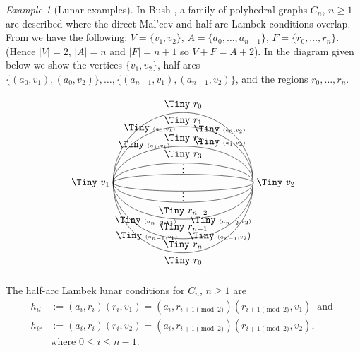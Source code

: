 \documentclass[12pt]{amsart}
\theoremstyle{definition}
\theoremstyle{remark}
\newtheorem{example}[thm]{Example}
\numberwithin{equation}{section}
\begin{document}
\begin{example}[Lunar examples] \label{ex:bush}
In Bush \cite{B}, a family of polyhedral graphs $C_n$, $n \ge 1$ are described  where the direct Ma{l}'cev and half-arc Lambek conditions overlap. From \cite[p.\ 440]{B} we have the following: $V=\{ v_1,v_2\}$, $A=\{a_0 , \ldots , a_{n-1} \}$, $F=\{ r_0 , \ldots , r_n \}$. (Hence $|V|=2$, $|A|=n$ and $|F|=n+1$ so $V+F=A+2$). In the diagram given below we show the vertices $\{ v_1, v_2 \}$, half-arcs  $\{ (a_0,v_1), (a_0,v_2)\} , \ldots, \{ (a_{n-1}, v_1) , (a_{n-1} , v_2) \}$, and the regions $r_0 , \ldots , r_n$.

\begin{minipage}[l]{0.35\textwidth}
\[
\begin{tikzpicture}

\draw (0,0) circle (2.5cm);

\draw (0,0) ellipse (2.5cm and 2cm);
\draw (0,0) ellipse (2.5cm and 1.3cm);
\draw (0,0) ellipse (2.5cm and 0.7cm);
\draw (0,0) ellipse (2.5cm and 0.3cm);

\node at (-1.2,1.95) {\Tiny $\scriptscriptstyle (a_0,v_1)$};
\node at (-1.3,-1.9) {\Tiny $\scriptscriptstyle (a_{n-1},v_1)$};
\node at (1.3,1.9) {\Tiny $\scriptscriptstyle (a_0,v_2)$};
\node at (1.3,-1.9) {\Tiny $\scriptscriptstyle (a_{n-1},v_2$)};

\node at (-1.4,1.35) {\Tiny $\scriptscriptstyle (a_1,v_1)$};
\node at (-1.34,-1.35) {\Tiny $\scriptscriptstyle (a_{n-2},v_1)$};
\node at (1.3,1.45) {\Tiny $\scriptscriptstyle (a_1,v_2)$};
\node at (1.34,-1.35) {\Tiny $\scriptscriptstyle (a_{n-2},v_2)$};

\node[left] at (-2.5,0) {\Tiny $v_1$};
\node[right] at (2.5,0) {\Tiny $v_2$};

\node[below] at (0,-2.5) {\Tiny $r_0$};
\node[above] at (0,-2.5) {\Tiny $r_n$};

\node[below] at (0,2.5) {\Tiny $r_1$};
\node[above] at (0,2.5) {\Tiny $r_0$};

\node[below] at (0,-1.3) {\Tiny $r_{n-1}$};
\node[above] at (0,-1.3) {\Tiny $r_{n-2}$};

\node[below] at (0,1.3) {\Tiny $r_3$};
\node[above] at (0,1.3) {\Tiny $r_2$};

\node at (0,0.6) {$\vdots$};
\node at (0,-0.4) {$\vdots$};


\end{tikzpicture}
\]
\end{minipage}%
\begin{minipage}[l]{0.6\textwidth}
\noindent
The  half-arc Lambek lunar conditions for $C_n$, $n \ge 1$ are
\begin{align*}
h_{il} &:= (a_i ,r_i )(r_i ,v_1) =  (a_i,r_{i+1\!\!\!\!\! {\pmod 2}})(r_{i+1\!\!\!\!\! {\pmod 2}} ,v_1)   \ \text{ and } \\
h_{ir} &:=  (a_i , r_i) (r_i ,v_{2} ) = (a_i,r_{i+1\!\!\!\!\! {\pmod 2}})(r_{i+1\!\!\!\!\! {\pmod 2}}, v_2) ,  \\
& 
\text{where } 0\le i\le n-1. 
\end{align*}


\end{minipage}
\end{example}
\end{document}
